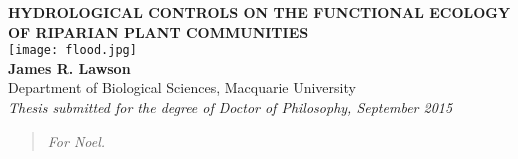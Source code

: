 \documentclass[openright,12pt,a4paper]{memoir}
\begin{document}
\doublespacing
{}

\begin{titlingpage}
\centering
\begin{onehalfspacing}
\vspace{40mm} %
\LARGE{\textbf{HYDROLOGICAL CONTROLS ON THE FUNCTIONAL ECOLOGY OF RIPARIAN PLANT COMMUNITIES}} \\
\vspace{25mm}
\texttt{[image: flood.jpg]} \\
\vspace{15mm}
\large{\textbf{James R. Lawson}}\\
\small{Department of Biological Sciences, Macquarie University}\\
\vspace{20mm}
\small{\textit{Thesis submitted for the degree of Doctor of Philosophy, September 2015}}\\
\end{onehalfspacing}
\end{titlingpage}

\frontmatter
\clearpage %
\renewcommand{\abstractname}{}
\setlength{\absparindent}{0mm}

\begin{abstract} %
\vspace{50mm}
\begin{center}
\textit{For Noel.}
\end{center}
\end{abstract}
\end{document}
